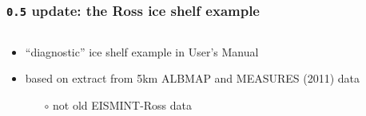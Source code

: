 \documentclass[hide notes,intlimits]{beamer}
\begin{document}
\begin{frame}
  \frametitle{\texttt{0.5} update: the Ross ice shelf example}

\begin{columns}
\begin{column}{0.7\textwidth}
\vspace{-5mm}
  \begin{itemize}
  \item ``diagnostic'' ice shelf example in User's Manual
  \item based on extract from 5km ALBMAP and MEASURES (2011) data
    \begin{itemize}
    \item[$\circ$] not old EISMINT-Ross data
    \end{itemize}
  \end{itemize}

\vspace{2mm}

\end{column}


\end{columns}
\end{frame}
\end{document}

